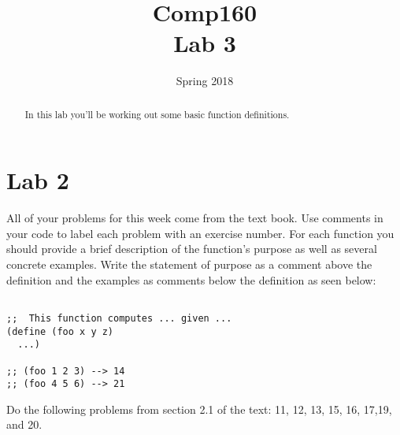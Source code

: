 \documentclass[nobib]{tufte-handout}
\title{Comp160 \\ Lab 3 }
\author{}
\date{ Spring 2018 }
\begin{document}
\maketitle

\begin{abstract}
In this lab you'll be working out some basic function definitions.
\end{abstract}

\section{Lab 2}

All of your problems for this week come from the text book. Use comments in your code to label each problem with an exercise number. For each function you should provide a brief description of the function's purpose as well as several concrete examples. Write the statement of purpose as a comment above the definition and the examples as comments below the definition as seen below:

\begin{lstlisting}

;;  This function computes ... given ...
(define (foo x y z)
  ...)

;; (foo 1 2 3) --> 14
;; (foo 4 5 6) --> 21
\end{lstlisting}

Do the following problems from section 2.1 of the text: 11, 12, 13, 15, 16, 17,19, and 20.
\end{document}
